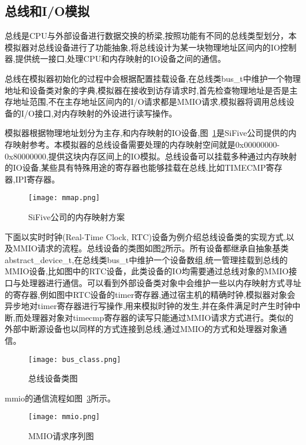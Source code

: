 \subsection{总线和I/O模拟}
总线是CPU与外部设备进行数据交换的桥梁,按照功能有不同的总线类型划分，本模拟器对总线设备进行了功能抽象,将总线设计为某一块物理地址区间内的IO控制器,提供统一接口,处理CPU和内存映射的IO设备之间的通信。


总线在模拟器初始化的过程中会根据配置挂载设备,在总线类bus\_t中维护一个物理地址和设备类对象的字典,模拟器在接收到访存请求时,首先检查物理地址是否是主存地址范围,不在主存地址区间内的I/O请求都是MMIO请求,模拟器将调用总线设备的I/O接口,对内存映射的外设进行读写操作。

模拟器根据物理地址划分为主存,和内存映射的IO设备,图~\ref{fig:mmap}是SiFive公司提供的内存映射参考。本模拟器的总线设备需要处理的内存映射空间就是0x00000000-0x80000000,提供这块内存区间上的IO模拟。总线设备可以挂载多种通过内存映射的IO设备,某些具有特殊用途的寄存器也能够挂载在总线,比如TIMECMP寄存器,IPI寄存器。
\begin{figure}[H]
    \centering
    \texttt{[image: mmap.png]}
    \caption{SiFive公司的内存映射方案}
    \label{fig:mmap}
\end{figure}

下面以实时时钟(Real-Time Clock, RTC)设备为例介绍总线设备类的实现方式,以及MMIO请求的流程。总线设备的类图如图\ref{fig:bus_class}所示。所有设备都继承自抽象基类abstract\_device\_t,在总线类bus\_t中维护一个设备数组,统一管理挂载到总线的MMIO设备,比如图中的RTC设备，此类设备的IO均需要通过总线对象的MMIO接口与处理器进行通信。可以看到外部设备类对象中会维护一些以内存映射方式寻址的寄存器,例如图中RTC设备的timer寄存器,通过宿主机的精确时钟,模拟器对象会异步地对timer寄存器进行写操作,用来模拟时钟的发生,并在条件满足时产生时钟中断,而处理器对象对timecmp寄存器的读写只能通过MMIO请求方式进行。类似的外部中断源设备也以同样的方式连接到总线,通过MMIO的方式和处理器对象通信。
\begin{figure}[H]
    \centering
    \texttt{[image: bus\_class.png]}
    \caption{总线设备类图}
    \label{fig:bus_class}
\end{figure}

mmio的通信流程如图~\ref{fig:mmio}所示。
\begin{figure}[H]
    \centering
    \texttt{[image: mmio.png]}
    \caption{MMIO请求序列图}
    \label{fig:mmio}
\end{figure}

